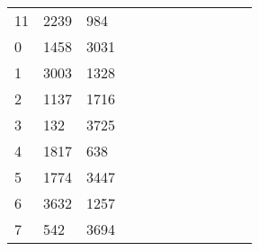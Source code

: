 \begin{table}[tb]
\begin{tabular}{|l|l|l|lllllllll}
		11 & 2239 & 984  &                           &                           &                           &                           &                           &                           &                          &                          &                           \\ \cline{1-3}
		0  & 1458 & 3031 &                           &                           &                           &                           &                           &                           &                          &                          &                           \\ \cline{1-3}
		1  & 3003 & 1328 &                           &                           &                           &                           &                           &                           &                          &                          &                           \\ \cline{1-3}
		2  & 1137 & 1716 &                           &                           &                           &                           &                           &                           &                          &                          &                           \\ \cline{1-3}
		3  & 132  & 3725 &                           &                           &                           &                           &                           &                           &                          &                          &                           \\ \cline{1-3}
		4  & 1817 & 638  &                           &                           &                           &                           &                           &                           &                          &                          &                           \\ \cline{1-3}
		5  & 1774 & 3447 &                           &                           &                           &                           &                           &                           &                          &                          &                           \\ \cline{1-3}
		6  & 3632 & 1257 &                           &                           &                           &                           &                           &                           &                          &                          &                           \\ \cline{1-3}
		7  & 542  & 3694 &                           &                           &                           &                           &                           &                           &                          &                          &                           \\ \cline{1-3}

\end{tabular}
\end{table}
